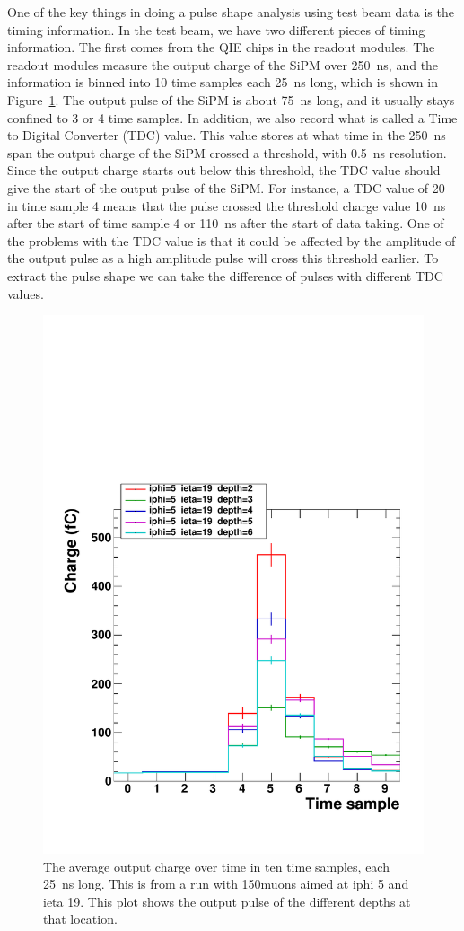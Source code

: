 One of the key things in doing a pulse shape analysis using test beam data is the timing information. In the test beam, we have two different pieces of timing information. The first comes from the QIE chips in the readout modules. The readout modules measure the output charge of the SiPM over 250~ns, and the information is binned into 10 time samples each 25~ns long, which is shown in Figure~\ref{fig:PulSh}. The output pulse of the SiPM is about 75~ns long, and it usually stays confined to 3 or 4 time samples. In addition, we also record what is called a Time to Digital Converter (TDC) value. This value stores at what time in the 250~ns span the output charge of the SiPM crossed a threshold, with 0.5~ns resolution. Since the output charge starts out below this threshold, the TDC value should give the start of the output pulse of the SiPM. For instance, a TDC value of 20 in time sample 4 means that the pulse crossed the threshold charge value 10~ns after the start of time sample 4 or 110~ns after the start of data taking. One of the problems with the TDC value is that it could be affected by the amplitude of the output pulse as a high amplitude pulse will cross this threshold earlier. To extract the pulse shape we can take the difference of pulses with different TDC values. 

\begin{figure}
\centering
\includegraphics[width=0.6\linewidth]{Figures/Pulse.pdf}
\caption{The average output charge over time in ten time samples, each 25~ns long. This is from a run with 150\GeV\space muons aimed at iphi 5 and ieta 19. This plot shows the output pulse of the different depths at that location.}
\label{fig:PulSh}
\end{figure}

